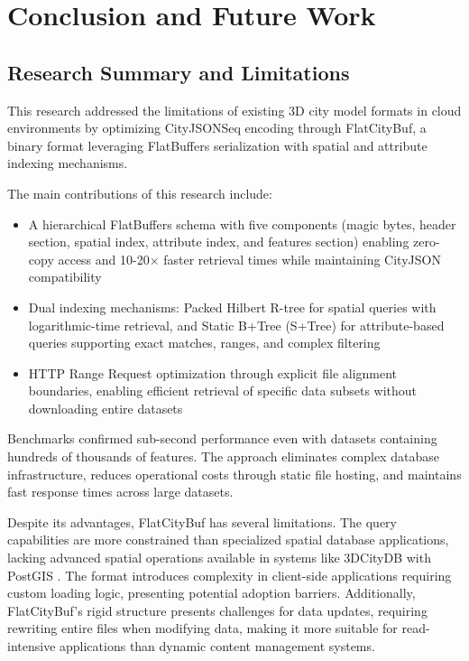 \chapter{Conclusion and Future Work}
\label{chp:conclusion}

\section{Research Summary and Limitations}
\label{conclusion:research_summary}

This research addressed the limitations of existing 3D city model formats in cloud environments by optimizing CityJSONSeq encoding through FlatCityBuf, a binary format leveraging FlatBuffers serialization with spatial and attribute indexing mechanisms.

The main contributions of this research include:

\begin{itemize}
  \item A hierarchical FlatBuffers schema with five components (magic bytes, header section, spatial index, attribute index, and features section) enabling zero-copy access and 10-20× faster retrieval times while maintaining CityJSON compatibility

  \item Dual indexing mechanisms: Packed Hilbert R-tree for spatial queries with logarithmic-time retrieval, and Static B+Tree (S+Tree) for attribute-based queries supporting exact matches, ranges, and complex filtering

  \item HTTP Range Request optimization through explicit file alignment boundaries, enabling efficient retrieval of specific data subsets without downloading entire datasets
\end{itemize}

Benchmarks confirmed sub-second performance even with datasets containing hundreds of thousands of features. The approach eliminates complex database infrastructure, reduces operational costs through static file hosting, and maintains fast response times across large datasets.

Despite its advantages, FlatCityBuf has several limitations. The query capabilities are more constrained than specialized spatial database applications, lacking advanced spatial operations available in systems like 3DCityDB \citep{3dcitydb} with PostGIS \citep{postgis}. The format introduces complexity in client-side applications requiring custom loading logic, presenting potential adoption barriers. Additionally, FlatCityBuf's rigid structure presents challenges for data updates, requiring rewriting entire files when modifying data, making it more suitable for read-intensive applications than dynamic content management systems.

